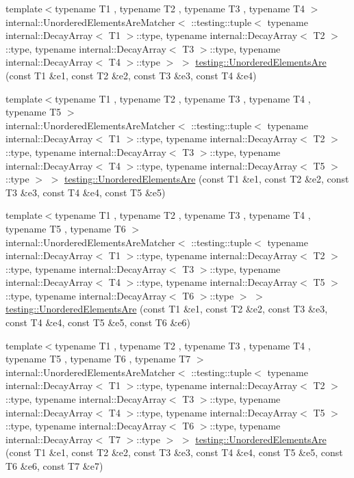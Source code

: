 \begin{DoxyCompactItemize}
\item 
{\footnotesize template$<$typename T1 , typename T2 , typename T3 , typename T4 $>$ }\\internal\+::\+Unordered\+Elements\+Are\+Matcher$<$ \+::testing\+::tuple$<$ typename internal\+::\+Decay\+Array$<$ T1 $>$\+::type, typename internal\+::\+Decay\+Array$<$ T2 $>$\+::type, typename internal\+::\+Decay\+Array$<$ T3 $>$\+::type, typename internal\+::\+Decay\+Array$<$ T4 $>$\+::type $>$ $>$ \mbox{\hyperlink{namespacetesting_a8dfb2b88d0cacb8ececc069b0b015991}{testing\+::\+Unordered\+Elements\+Are}} (const T1 \&e1, const T2 \&e2, const T3 \&e3, const T4 \&e4)
\item 
{\footnotesize template$<$typename T1 , typename T2 , typename T3 , typename T4 , typename T5 $>$ }\\internal\+::\+Unordered\+Elements\+Are\+Matcher$<$ \+::testing\+::tuple$<$ typename internal\+::\+Decay\+Array$<$ T1 $>$\+::type, typename internal\+::\+Decay\+Array$<$ T2 $>$\+::type, typename internal\+::\+Decay\+Array$<$ T3 $>$\+::type, typename internal\+::\+Decay\+Array$<$ T4 $>$\+::type, typename internal\+::\+Decay\+Array$<$ T5 $>$\+::type $>$ $>$ \mbox{\hyperlink{namespacetesting_a5e0ff76eb3f61b6c79b60311ceca73d3}{testing\+::\+Unordered\+Elements\+Are}} (const T1 \&e1, const T2 \&e2, const T3 \&e3, const T4 \&e4, const T5 \&e5)
\item 
{\footnotesize template$<$typename T1 , typename T2 , typename T3 , typename T4 , typename T5 , typename T6 $>$ }\\internal\+::\+Unordered\+Elements\+Are\+Matcher$<$ \+::testing\+::tuple$<$ typename internal\+::\+Decay\+Array$<$ T1 $>$\+::type, typename internal\+::\+Decay\+Array$<$ T2 $>$\+::type, typename internal\+::\+Decay\+Array$<$ T3 $>$\+::type, typename internal\+::\+Decay\+Array$<$ T4 $>$\+::type, typename internal\+::\+Decay\+Array$<$ T5 $>$\+::type, typename internal\+::\+Decay\+Array$<$ T6 $>$\+::type $>$ $>$ \mbox{\hyperlink{namespacetesting_aff1859501ecd94dd1bc428d146a66fdc}{testing\+::\+Unordered\+Elements\+Are}} (const T1 \&e1, const T2 \&e2, const T3 \&e3, const T4 \&e4, const T5 \&e5, const T6 \&e6)
\item 
{\footnotesize template$<$typename T1 , typename T2 , typename T3 , typename T4 , typename T5 , typename T6 , typename T7 $>$ }\\internal\+::\+Unordered\+Elements\+Are\+Matcher$<$ \+::testing\+::tuple$<$ typename internal\+::\+Decay\+Array$<$ T1 $>$\+::type, typename internal\+::\+Decay\+Array$<$ T2 $>$\+::type, typename internal\+::\+Decay\+Array$<$ T3 $>$\+::type, typename internal\+::\+Decay\+Array$<$ T4 $>$\+::type, typename internal\+::\+Decay\+Array$<$ T5 $>$\+::type, typename internal\+::\+Decay\+Array$<$ T6 $>$\+::type, typename internal\+::\+Decay\+Array$<$ T7 $>$\+::type $>$ $>$ \mbox{\hyperlink{namespacetesting_add6e16fe24c45e39e92c0d19c04acf11}{testing\+::\+Unordered\+Elements\+Are}} (const T1 \&e1, const T2 \&e2, const T3 \&e3, const T4 \&e4, const T5 \&e5, const T6 \&e6, const T7 \&e7)

\end{DoxyCompactItemize}
